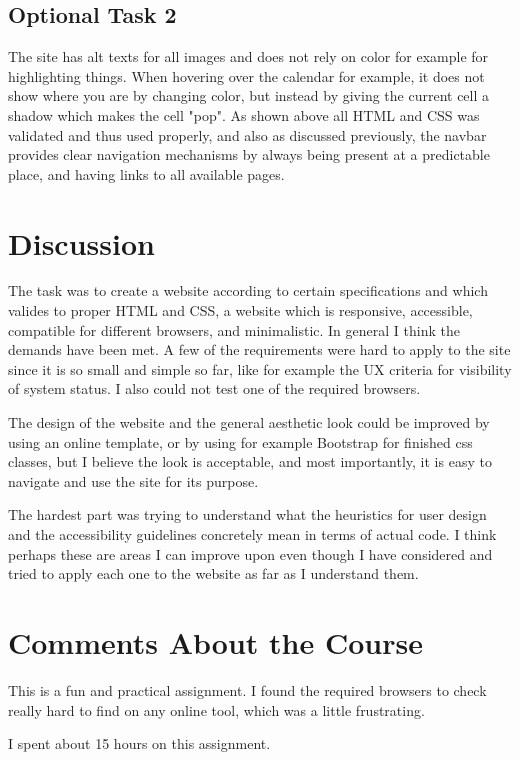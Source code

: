 \documentclass[a4paper]{scrreprt}
\begin{document}
\section{Optional Task 2}

The site has alt texts for all images and does not rely on color for example for highlighting things. When hovering over the calendar for example, it does not show where you are by changing color, but instead by giving the current cell a shadow which makes the cell "pop". As shown above all HTML and CSS was validated and thus used properly, and also as discussed previously, the navbar provides clear navigation mechanisms by always being present at a predictable place, and having links to all available pages.

\chapter{Discussion}

The task was to create a website according to certain specifications and which valides to proper HTML and CSS, a website which is responsive, accessible, compatible for different browsers, and minimalistic. In general I think the demands have been met. A few of the requirements were hard to apply to the site since it is so small and simple so far, like for example the UX criteria for visibility of system status. I also could not test one of the required browsers.

The design of the website and the general aesthetic look could be improved by using an online template, or by using for example Bootstrap for finished css classes, but I believe the look is acceptable, and most importantly, it is easy to navigate and use the site for its purpose.

The hardest part was trying to understand what the heuristics for user design and the accessibility guidelines concretely mean in terms of actual code. I think perhaps these are areas I can improve upon even though I have considered and tried to apply each one to the website as far as I understand them.

\chapter{Comments About the Course}

This is a fun and practical assignment. I found the required browsers to check really hard to find on any online tool, which was a little frustrating.

I spent about 15 hours on this assignment.
\end{document}
